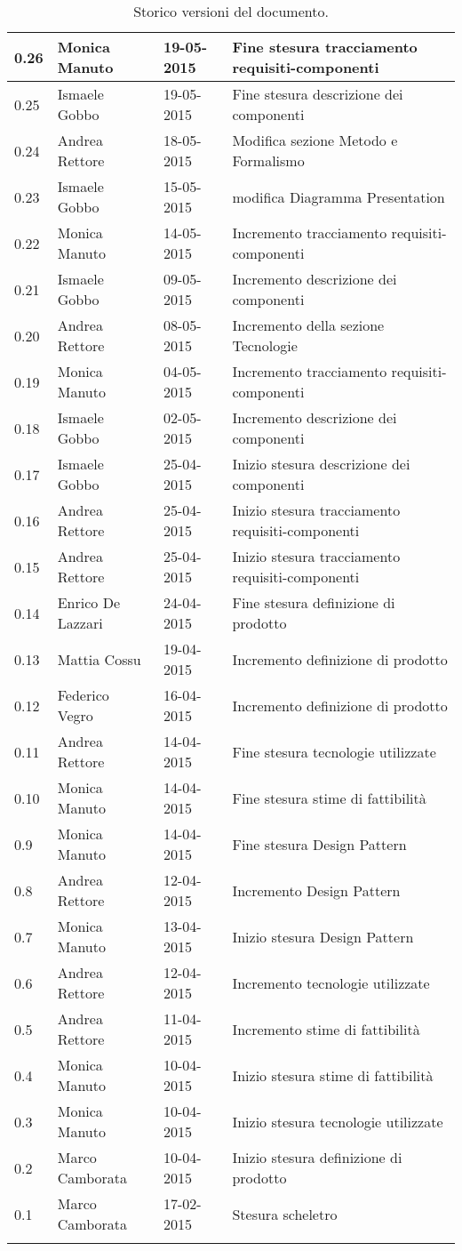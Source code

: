 \begin{longtable}{|l|l|l|p{}|}
\hline
0.26 & Monica Manuto & 19-05-2015 & Fine stesura tracciamento requisiti-componenti \\
\hline
0.25 & Ismaele Gobbo & 19-05-2015 & Fine stesura descrizione dei componenti \\
\hline
0.24 & Andrea Rettore & 18-05-2015 & Modifica sezione Metodo e Formalismo \\
\hline
0.23 & Ismaele Gobbo & 15-05-2015 & modifica Diagramma Presentation \\
\hline
0.22 & Monica Manuto & 14-05-2015 & Incremento tracciamento requisiti-componenti \\
\hline
0.21 & Ismaele Gobbo & 09-05-2015 & Incremento descrizione dei componenti \\
\hline
0.20 & Andrea Rettore & 08-05-2015 & Incremento della sezione Tecnologie \\
\hline
0.19 & Monica Manuto & 04-05-2015 & Incremento tracciamento requisiti-componenti \\
\hline
0.18 & Ismaele Gobbo & 02-05-2015 & Incremento descrizione dei componenti \\
\hline
0.17 & Ismaele Gobbo & 25-04-2015 & Inizio stesura descrizione dei componenti \\
\hline
0.16 & Andrea Rettore & 25-04-2015 & Inizio stesura tracciamento requisiti-componenti \\
\hline
0.15 & Andrea Rettore & 25-04-2015 & Inizio stesura tracciamento requisiti-componenti \\
\hline
0.14 & Enrico De Lazzari & 24-04-2015 & Fine stesura definizione di prodotto \\
\hline
0.13 & Mattia Cossu & 19-04-2015 & Incremento definizione di prodotto \\
\hline
0.12 & Federico Vegro & 16-04-2015 & Incremento definizione di prodotto \\
\hline
0.11 & Andrea Rettore & 14-04-2015 & Fine stesura tecnologie utilizzate \\
\hline
0.10 & Monica Manuto & 14-04-2015 & Fine stesura stime di fattibilità \\
\hline
0.9 & Monica Manuto & 14-04-2015 & Fine stesura Design Pattern \\
\hline
0.8 & Andrea Rettore & 12-04-2015 & Incremento Design Pattern \\
\hline
0.7 & Monica Manuto & 13-04-2015 & Inizio stesura Design Pattern \\
\hline
0.6 & Andrea Rettore & 12-04-2015 & Incremento tecnologie utilizzate \\
\hline
0.5 & Andrea Rettore & 11-04-2015 & Incremento stime di fattibilità \\
\hline
0.4 & Monica Manuto & 10-04-2015 & Inizio stesura stime di fattibilità \\
\hline
0.3 & Monica Manuto & 10-04-2015 & Inizio stesura tecnologie utilizzate \\
\hline
0.2 & Marco Camborata & 10-04-2015 & Inizio stesura definizione di prodotto \\
\hline
0.1 & Marco Camborata & 17-02-2015 & Stesura scheletro \\
\hline
\caption{Storico versioni del documento.}
\end{longtable}
